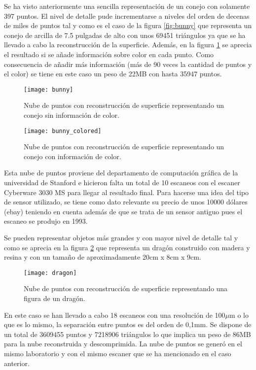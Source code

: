 Se ha visto anteriormente una sencilla representación de un conejo con solamente 397 puntos. El nivel de detalle pude incrementarse a niveles del orden de decenas de miles de puntos tal y como es el caso de la figura \ref{fig:bunny} que representa un conejo de arcilla de 7.5 pulgadas de alto con unos 69451 triángulos ya que se ha llevado a cabo la reconstrucción de la superficie. Además, en la figura \ref{fig:bunny_colored} se aprecia el resultado si se añade información sobre color en cada punto.
Como consecuencia de añadir más información (más de 90 veces la cantidad de puntos y el color) se tiene en este caso un peso de 22MB con hasta 35947 puntos.
\begin{figure}[!htb]
  \texttt{[image: bunny]}
  \caption{Nube de puntos con reconstrucción de superficie representando un conejo sin información de color.}\label{fig:bunny}
\endminipage\hfill
{}
  \texttt{[image: bunny\_colored]}
  \caption{Nube de puntos con reconstrucción de superficie representando un conejo con información de color.}\label{fig:bunny_colored}
\endminipage\hfill
\end{figure}
Esta nube de puntos proviene del departamento de computación gráfica de la universidad de Stanford e hicieron falta un total de 10 escaneos con el escaner Cyberware 3030 MS para llegar al resultado final. Para hacerse una idea del tipo de sensor utilizado, se tiene como dato relevante su precio de unos 10000 dólares (ebay) teniendo en cuenta además de que se trata de un sensor antiguo pues el escaneo se produjo en 1993.


Se pueden representar objetos más grandes y con mayor nivel de detalle tal y como se aprecia en la figura \ref{fig:dragon} que representa un dragón construido con madera y resina y con un tamaño de aproximadamente 20cm x 8cm x 9cm.

\begin{figure}
\centering
\texttt{[image: dragon]}
\caption{Nube de puntos con reconstrucción de superficie representando una figura de un dragón.}\label{fig:dragon}
\end{figure}

En este caso se han llevado a cabo 18 escaneos con una resolución de 100$\mu$m o lo que es lo mismo, la separación entre puntos es del orden de 0,1mm. Se dispone de un total de 3609455 puntos y 7218906 triángulos lo que implica un peso de 86MB para la nube reconstruida y descomprimida.
La nube de puntos se generó en el mismo laboratorio y con el mismo escaner que se ha mencionado en el caso anterior.

